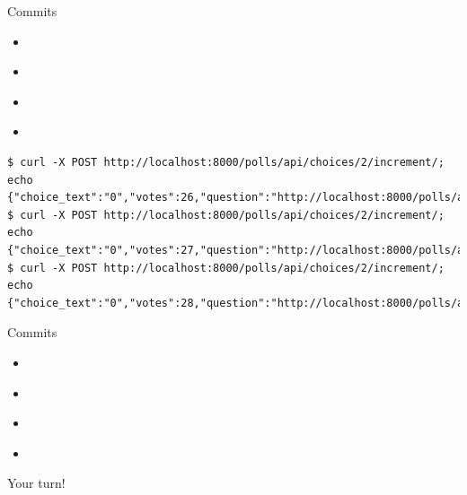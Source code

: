 \documentclass[xcolor=svgnames,17pt]{beamer}
\newcommand*{\sizefont}[1]{%
    \ifcase#1\relax
    \or \tiny
    \or \scriptsize
    \or \footnotesize
    \or \small
    \or \normalsize
    \or \large
    \or \Large
    \or \LARGE
    \or \huge
    \or \Huge
    \fi}
\begin{document}
\begin{frame}[fragile]{Commits}
\begin{itemize}
\item \href{https://github.com/andrewdotn/django-react/commit/bef198f2332ab6ef492652f96aa1c46bb3a4503a}{}
\item \href{https://github.com/andrewdotn/django-react/commit/727df519b9163ed73354f878a68e21d15c9bf598}{}
\item \href{https://github.com/andrewdotn/django-react/commit/5d9b19184e444f2d38d2ccec9c53b9d9b431b9a1}{}
\pause
\item \href{https://github.com/andrewdotn/django-react/commit/89ce5e01fb8f74ffbcd53c5fce467e0c667af416}{}
\end{itemize}
\sizefont{1}
\begin{verbatim}
$ curl -X POST http://localhost:8000/polls/api/choices/2/increment/; echo
{"choice_text":"0","votes":26,"question":"http://localhost:8000/polls/api/questions/2/","url":"http://localhost:8000/polls/api/choices/2/"}
$ curl -X POST http://localhost:8000/polls/api/choices/2/increment/; echo
{"choice_text":"0","votes":27,"question":"http://localhost:8000/polls/api/questions/2/","url":"http://localhost:8000/polls/api/choices/2/"}
$ curl -X POST http://localhost:8000/polls/api/choices/2/increment/; echo
{"choice_text":"0","votes":28,"question":"http://localhost:8000/polls/api/questions/2/","url":"http://localhost:8000/polls/api/choices/2/"}
\end{verbatim}
\end{frame}

\begin{frame}{Commits}
\begin{itemize}
\item \href{https://github.com/andrewdotn/django-react/commit/bef198f2332ab6ef492652f96aa1c46bb3a4503a}{}
\item \href{https://github.com/andrewdotn/django-react/commit/727df519b9163ed73354f878a68e21d15c9bf598}{}
\item \href{https://github.com/andrewdotn/django-react/commit/5d9b19184e444f2d38d2ccec9c53b9d9b431b9a1}{}
\item \href{https://github.com/andrewdotn/django-react/commit/89ce5e01fb8f74ffbcd53c5fce467e0c667af416}{}
\end{itemize}
Your turn!
\end{frame}
\end{document}

